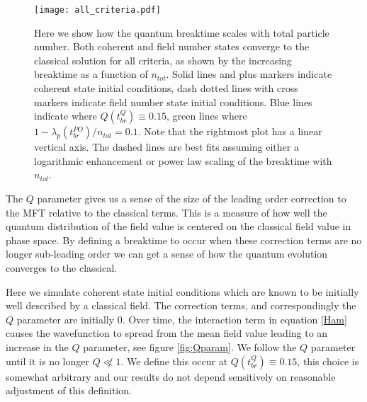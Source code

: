 \documentclass[aps,prd,twocolumn,superscriptaddress]{revtex4-1}
\begin{document}
\begin{figure*}
	\texttt{[image: all\_criteria.pdf]}
	\caption{Here we show how the quantum breaktime scales with total particle number. Both coherent and field number states converge to the classical solution for all criteria, as shown by the increasing breaktime as a function of $n_{tot}$. Solid lines and plus markers indicate coherent state initial conditions, dash dotted lines with cross markers indicate field number state initial conditions. Blue lines indicate where $Q(t^Q_{br}) \equiv 0.15$, green lines where $1-\lambda_p(t^{PO}_{br})/n_{tot} = 0.1$. Note that the rightmost plot has a linear vertical axis. The dashed lines are best fits assuming either a logarithmic enhancement or power law scaling of the breaktime with $n_{tot}$. }
	\label{fig:params}
\end{figure*}

\begin{comment}

\begin{figure*}
	\texttt{[image: LGQC\_criteria.pdf]}
	\caption{Here we show how the quantum breaktime scales with total particle number. Coherent state initial condition are used. Here we show systems with contact interactions and quadratic dispersion on the left, and systems with long range interactions and linear dispersion's on the right. Blue lines indicate where $Q(t^Q_{br}) \equiv 0.15$, green lines where $1-\lambda_p(t^{PO}_{br})/n_{tot} = 0.1$. The dashed lines are best fits assuming power law scaling of the breaktime with $n_{tot}$. }
	\label{fig:paramsOther}
\end{figure*}

\end{comment}

The $Q$ parameter gives us a sense of the size of the leading order correction to the MFT relative to the classical terms. This is a measure of how well the quantum distribution of the field value is centered on the classical field value in phase space. By defining a breaktime to occur when these correction terms are no longer sub-leading order we can get a sense of how the quantum evolution converges to the classical. 

Here we simulate coherent state initial conditions which are known to be initially well described by a classical field. The correction terms, and correspondingly the $Q$ parameter are initially $0$. Over time, the interaction term in equation \eqref{Ham} causes the wavefunction to spread from the mean field value leading to an increase in the $Q$ parameter, see figure \ref{fig:Qparam}. We follow the $Q$ parameter until it is no longer $Q \not\ll 1$. We define this occur at $Q(t^Q_{br}) \equiv 0.15$, this choice is somewhat arbitrary and our results do not depend sensitively on reasonable adjustment of this definition.
\end{document}
